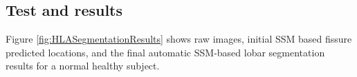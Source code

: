 \documentclass[]{spie}  %
\begin{document}
{\subsection{Test and results}
Figure \ref{fig:HLASegmentationResults} shows raw images, initial SSM based fissure predicted locations, and the final automatic SSM-based lobar segmentation results for a normal healthy subject.  

}
\end{document}
